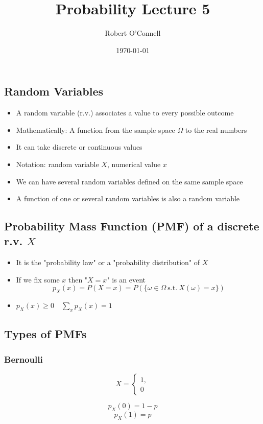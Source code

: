 \documentclass{article}
\title{\textbf{Probability Lecture 5}}
\author{Robert O'Connell}
\date{\today}
\begin{document}
\maketitle
\subsection*{Random Variables}
\begin{itemize}
    \item A random variable (r.v.) associates a value to every possible outcome
    \item Mathematically: A function from the sample space \(\Omega\) to the real numbers
    \item It can take discrete or continuous values
    \item Notation: random variable \(X\), numerical value \(x\)
    \item We can have several random variables defined on the same sample space
    \item A function of one or several random variables is also a random variable
\end{itemize}

\subsection*{Probability Mass Function (PMF) of a discrete r.v. \(X\)}
\begin{itemize}
    \item It is the "probability law" or a "probability distribution" of \(X\)
    \item If we fix some \(x\) then "\(X=x\)" is an event
\[
p_X(x) = P(X=x) = P(\{\omega \in \Omega \ \text{s.t.} \ X(\omega) = x\})
\]
    \item \(p_X(x) \geq 0 \quad \sum_{x} p_X(x) = 1 \)
\end{itemize}

\subsection*{Types of PMFs}
\subsubsection*{Bernoulli}
\[
X = \begin{cases}
    1,\\0
\end{cases}
\]

\[
p_X(0) = 1 - p
\]
\[
p_X(1) = p
\]
\end{document}
